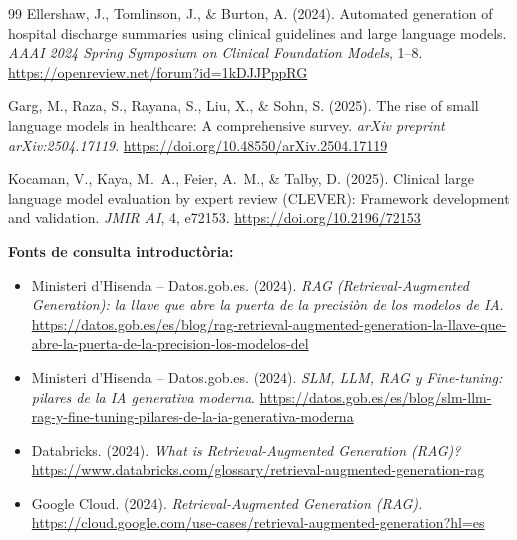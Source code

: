 \documentclass[CAT]{TFUOC}%
\begin{document}
\begin{thebibliography}{99}
Ellershaw, J., Tomlinson, J., \& Burton, A. (2024).
\newblock Automated generation of hospital discharge summaries
using clinical guidelines and large language models.
\newblock \textit{AAAI 2024 Spring Symposium on Clinical
Foundation Models}, 1--8.
\newblock \url{https://openreview.net/forum?id=1kDJJPppRG}

Garg, M., Raza, S., Rayana, S., Liu, X., \& Sohn, S. (2025).
\newblock The rise of small language models in healthcare:
A comprehensive survey.
\newblock \textit{arXiv preprint arXiv:2504.17119}.
\newblock \url{https://doi.org/10.48550/arXiv.2504.17119}

Kocaman, V., Kaya, M.~A., Feier, A.~M., \& Talby, D. (2025).
\newblock Clinical large language model evaluation by expert
review (CLEVER): Framework development and validation.
\newblock \textit{JMIR AI}, 4, e72153.
\newblock \url{https://doi.org/10.2196/72153}

\end{thebibliography}

\vspace{0.5cm}

\noindent\textbf{Fonts de consulta introduct\`oria:}
\begin{itemize}
\item Ministeri d'Hisenda -- Datos.gob.es. (2024). \textit{RAG (Retrieval-Augmented Generation): la llave que abre la puerta de la precisi\`on de los modelos de IA}. \url{https://datos.gob.es/es/blog/rag-retrieval-augmented-generation-la-llave-que-abre-la-puerta-de-la-precision-los-modelos-del}

\item Ministeri d'Hisenda -- Datos.gob.es. (2024). \textit{SLM, LLM, RAG y Fine-tuning: pilares de la IA generativa moderna}. \url{https://datos.gob.es/es/blog/slm-llm-rag-y-fine-tuning-pilares-de-la-ia-generativa-moderna}

\item Databricks. (2024). \textit{What is Retrieval-Augmented Generation (RAG)?} \url{https://www.databricks.com/glossary/retrieval-augmented-generation-rag}

\item Google Cloud. (2024). \textit{Retrieval-Augmented Generation (RAG).} \url{https://cloud.google.com/use-cases/retrieval-augmented-generation?hl=es}
\end{itemize}

\vspace{0.5cm}
\end{document}
